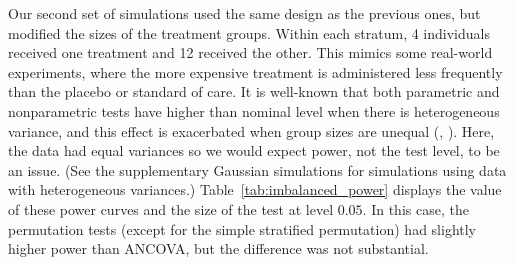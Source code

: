 \documentclass[12pt]{article}
\begin{document}
Our second set of simulations used the same design as the previous ones, but modified the sizes of the treatment groups.
Within each stratum, 4 individuals received one treatment and 12 received the other.
This mimics some real-world experiments, where the more expensive treatment is administered less frequently than the placebo or standard of care.
It is well-known that both parametric and nonparametric tests have higher than nominal level when there is heterogeneous variance, and this effect is exacerbated when group sizes are unequal (\cite{glass_consequences_1972}, \cite{zimmerman_two_2006}).
Here, the data had equal variances so we would expect power, not the test level, to be an issue.
(See the supplementary Gaussian simulations for simulations using data with heterogeneous variances.)
Table~\ref{tab:imbalanced_power} displays the value of these power curves and the size of the test at level $0.05$.
In this case, the permutation tests (except for the simple stratified permutation) had slightly higher power than ANCOVA, but the difference was not substantial.

%
\end{document}
